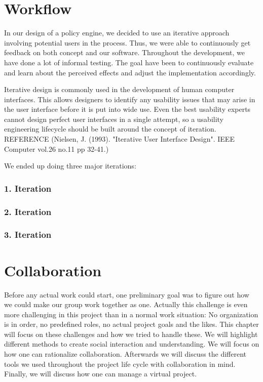 \section{Workflow} \label{sec:workflow}
In our design of a policy engine, we decided to use an iterative approach involving potential users in the process. Thus, we were able to continuously get feedback on both concept and our software. Throughout the development, we have done a lot of informal testing. The goal have been to continuously evaluate and learn about the perceived effects and adjust the implementation accordingly. 

Iterative design is commonly used in the development of human computer interfaces. This allows designers to identify any usability issues that may arise in the user interface before it is put into wide use. Even the best usability experts cannot design perfect user interfaces in a single attempt, so a usability engineering lifecycle should be built around the concept of iteration. REFERENCE (Nielsen, J. (1993). "Iterative User Interface Design". IEEE Computer vol.26 no.11 pp 32-41.)

We ended up doing three major iterations:

\subsubsection{1. Iteration}
\subsubsection{2. Iteration}
\subsubsection{3. Iteration}


\section{Collaboration} \label{sec:collaboration}
Before any actual work could start, one preliminary goal was to figure out how we could make our group work together as one. Actually this challenge is even more challenging in this project than in a normal work situation: No organization is in order, no predefined roles, no actual project goals and the likes. This chapter will focus on these challenges and how we tried to handle these. We will highlight different methods to create social interaction and understanding. We will focus on how one can rationalize collaboration. Afterwards we will discuss the different tools we used throughout the project life cycle with collaboration in mind. Finally, we will discuss how one can manage a virtual project.\\


